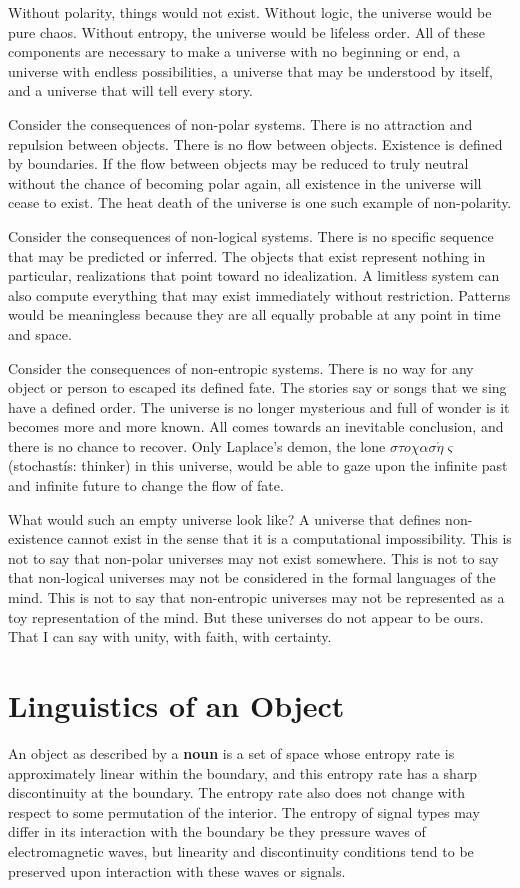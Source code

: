 \documentclass[10pt, a5paper, twoside, openright]{memoir}
\begin{document}
Without polarity, things would not exist. Without logic, the universe would be pure chaos. Without entropy, the universe would be lifeless order. All of these components are necessary to make a universe with no beginning or end, a universe with endless possibilities, a universe that may be understood by itself, and a universe that will tell every story.

Consider the consequences of non-polar systems. There is no attraction and repulsion between objects. There is no flow between objects. Existence is defined by boundaries. If the flow between objects may be reduced to truly neutral without the chance of becoming polar again, all existence in the universe will cease to exist. The heat death of the universe is one such example of non-polarity.

Consider the consequences of non-logical systems. There is no specific sequence that may be predicted or inferred. The objects that exist represent nothing in particular, realizations that point toward no idealization. A limitless system can also compute everything that may exist immediately without restriction. Patterns would be meaningless because they are all equally probable at any point in time and space.

Consider the consequences of non-entropic systems. There is no way for any object or person to escaped its defined fate. The stories say or songs that we sing have a defined order. The universe is no longer mysterious and full of wonder is it becomes more and more known. All comes towards an inevitable conclusion, and there is no chance to recover. Only Laplace's demon, the lone $\sigma \tau o \chi \alpha \sigma \acute \eta \varsigma$ (stochast\'is: thinker) in this universe, would be able to gaze upon the infinite past and infinite future to change the flow of fate.

What would such an empty universe look like? A universe that defines non-existence cannot exist in the sense that it is a computational impossibility. This is not to say that non-polar universes may not exist somewhere. This is not to say that non-logical universes may not be considered in the formal languages of the mind. This is not to say that non-entropic universes may not be represented as a toy representation of the mind. But these universes do not appear to be ours. That I can say with unity, with faith, with certainty.

\section{Linguistics of an Object}
An object as described by a \textbf{noun} is a set of space whose entropy rate is approximately linear within the boundary, and this entropy rate has a sharp discontinuity at the boundary. The entropy rate also does not change with respect to some permutation of the interior. The entropy of signal types may differ in its interaction with the boundary be they pressure waves of electromagnetic waves, but linearity and discontinuity conditions tend to be preserved upon interaction with these waves or signals. 
\end{document}
